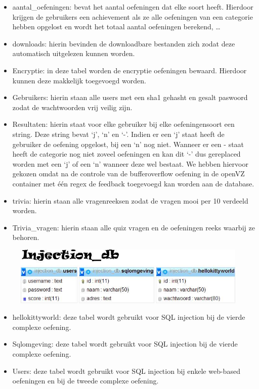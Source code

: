	\begin{itemize}
	\item aantal\_oefeningen: bevat het aantal oefeningen dat elke soort heeft. Hierdoor krijgen de gebruikers een achievement als ze alle oefeningen van een categorie hebben opgelost en wordt het totaal aantal oefeningen berekend, \ldots
	\item downloads: hierin bevinden de downloadbare bestanden zich zodat deze automatisch uitgelezen kunnen worden.
	\item Encryptie: in deze tabel worden de encryptie oefeningen bewaard. Hierdoor kunnen deze makkelijk toegevoegd worden.
	\item Gebruikers: hierin staan alle users met een sha1 gehasht en gesalt paswoord zodat de wachtwoorden vrij veilig zijn.
	\item Resultaten: hierin staat voor elke gebruiker bij elke oefeningensoort een string. Deze string bevat `j', `n' en `-'. Indien er een `j' staat heeft de gebruiker de oefening opgelost, bij een `n' nog niet. Wanneer er een - staat heeft de categorie nog niet zoveel oefeningen en kan dit `-' dus gereplaced worden met een `j' of een `n' wanneer deze wel bestaat. We hebben hiervoor gekozen omdat na de controle van de bufferoverflow oefening in de openVZ container met \'e\'en regex de feedback toegevoegd kan worden aan de database.
	\item trivia: hierin staan alle vragenreeksen zodat de vragen mooi per 10 verdeeld worden.
	\item Trivia\_vragen: hierin staan alle quiz vragen en de oefeningen reeks waarbij ze behoren.
	\end{itemize}

\begin{figure}[H]

\includegraphics[scale=0.5,bb= -100 0 0 175]{systeem/db2.jpg}
\end{figure}

	\begin{itemize}
	\item hellokittyworld: deze tabel wordt gebruikt voor SQL injection bij de vierde complexe oefening.
	\item Sqlomgeving: deze tabel wordt gebruikt voor SQL injection bij de vierde complexe oefening.
	\item Users: deze tabel wordt gebruikt voor SQL injection bij enkele web-based oefeningen en bij de tweede complexe oefening.
	\end{itemize}


